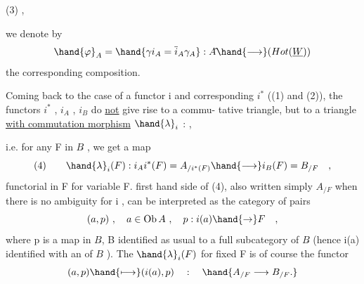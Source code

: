 
(3) \hfill ,

we denote by
\[ \hand{\varphi}_A= \hand{\gamma i_A = \overline{i}_A\gamma_A} : A\hat{} \hand{\longrightarrow} (Hot(\underline{W})) \]
the corresponding composition.

Coming back to the case of a functor i and corresponding $i^*$
((1) and (2)), the functors $i^*$ , $i_A$ , $i_B$ do \uline{not} give rise to a commu-%
tative triangle, but to a triangle \uline{with commutation morphism} $\hand{\lambda}_i$ :
\hfill ,

i.e. for any F in $B\hat{}$ , we get a map 
\[ (4) \qquad \hand{\lambda}_i(F) : i_Ai^*(F) = A_{/i^{*}(F)} \hand{\longrightarrow} i_B(F) = B_{/F} \quad , \]
functorial in F for variable F.  first hand side of (4), also
written simply $A_{/F}$ when there is no ambiguity for i ,  can be
interpreted as the category of pairs
\[ (a,p) \ , \quad a \in \mathrm{Ob}\, A \ , \quad p: i(a) \hand{\to} F \quad , \]
where p is a map in $B\hat{}$, B identified as usual to a full subcategory of
$B\hat{}$ (hence i(a) identified with an  of $B\hat{}$ ). The   $\hand{\lambda}_i(F)$
for fixed F is of course the  functor
\[ (a,p) \hand{\longmapsto} (i(a),p) \quad : \quad \hand{A_{/F} \longrightarrow B_{/F} .} \]

